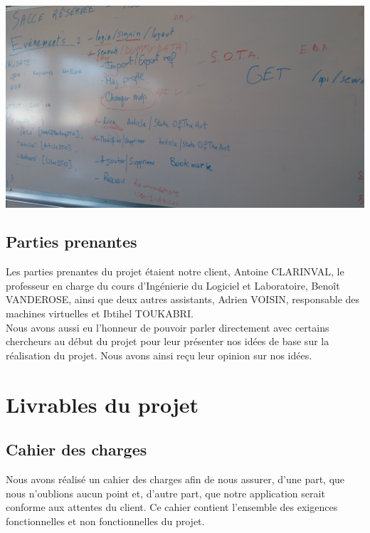 \documentclass[t, 12pt, usenames,dvipsnames]{article}
\begin{document}
            \begin{center}                               
                \includegraphics[scale=.08]{images/sprint/exemple-tableau.jpg}
                \label{fig:tableau_todo}
            \end{center}
            
        \newpage
        
        \subsection{Parties prenantes}
            \noindent Les parties prenantes du projet étaient notre client, Antoine CLARINVAL, le professeur en charge du cours d'Ingénierie du Logiciel et Laboratoire, Benoît VANDEROSE, ainsi que deux autres assistants, Adrien VOISIN, responsable des machines virtuelles et Ibtihel TOUKABRI.\\
            Nous avons aussi eu l'honneur de pouvoir parler directement avec certains chercheurs au début du projet pour leur présenter nos idées de base sur la réalisation du projet. Nous avons ainsi reçu leur opinion sur nos idées.

    \newpage
    
    \section{Livrables du projet}
        
        \subsection{Cahier des charges}
            \noindent Nous avons réalisé un cahier des charges afin de nous assurer, d'une part, que nous n'oublions aucun point et, d'autre part, que notre application serait conforme aux attentes du client. Ce cahier contient l'ensemble des exigences fonctionnelles et non fonctionnelles du projet.
            
\end{document}
